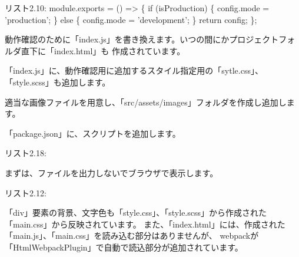 \begin{starterprogram}{リスト2.10: }
{  module.exports = () =\textgreater{} \{
    if (isProduction) \{
      config.mode = 'production';
    \} else \{
      config.mode = 'development';
    \}
    return config;
  \};
}\end{starterprogram}

動作確認のために「index.js」を書き換えます。いつの間にかプロジェクトフォルダ直下に「index.html」も
作成されています。

「index.js」に、動作確認用に追加するスタイル指定用の「sytle.css」、「style.scss」も追加します。

適当な画像ファイルを用意し、「src/assets/images」フォルダを作成し追加します。

「package.json」に、スクリプトを追加します。

\def\startercodeblockfontsize{}
\begin{starterprogram}{リスト2.18: }\end{starterprogram}

まずは、ファイルを出力しないでブラウザで表示します。

\def\startercodeblockfontsize{}
\begin{starterterminal}[ブラウザで表示]{リスト2.12: }\end{starterterminal}

「div」要素の背景、文字色も「style.css」、「style.scss」から作成された「main.css」から反映されています。
また、「index.html」には、作成された「main.js」、「main.css」を読み込む部分はありませんが、
webpackが「HtmlWebpackPlugin」で自動で読込部分が追加されています。


